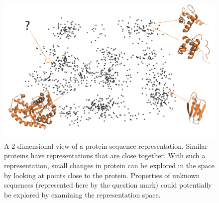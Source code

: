 \begin{figure}[ht]
    \centering
    \includegraphics[width=\textwidth]{figures/figure.pdf}
    \caption{A 2-dimensional view of a protein sequence representation. Similar proteins have representations that are close together. With such a representation, small changes in protein can be explored in the space by looking at points close to the protein. Properties of unknown sequences (represented here by the question mark) could potentially be explored by examining the representation space.}
    \label{fig:latentSpace}
\end{figure}





